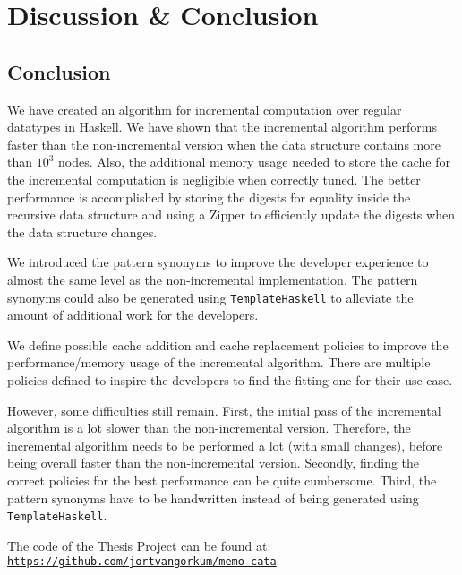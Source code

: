 \chapter{Discussion \& Conclusion}





\section{Conclusion}

We have created an algorithm for incremental computation over regular datatypes in Haskell. We have shown that the incremental algorithm performs faster than the non-incremental version when the data structure contains more than $10^3$ nodes. Also, the additional memory usage needed to store the cache for the incremental computation is negligible when correctly tuned. The better performance is accomplished by storing the digests for equality inside the recursive data structure and using a Zipper to efficiently update the digests when the data structure changes.

We introduced the pattern synonyms to improve the developer experience to almost the same level as the non-incremental implementation. The pattern synonyms could also be generated using \texttt{TemplateHaskell} to alleviate the amount of additional work for the developers.

We define possible cache addition and cache replacement policies to improve the performance/memory usage of the incremental algorithm. There are multiple policies defined to inspire the developers to find the fitting one for their use-case.

However, some difficulties still remain. First, the initial pass of the incremental algorithm is a lot slower than the non-incremental version. Therefore, the incremental algorithm needs to be performed a lot (with small changes), before being overall faster than the non-incremental version. Secondly, finding the correct policies for the best performance can be quite cumbersome. Third, the pattern synonyms have to be handwritten instead of being generated using \texttt{TemplateHaskell}.

The code of the Thesis Project can be found at: \href{https://github.com/jortvangorkum/memo-cata}{\texttt{https://github.com/jortvangorkum/memo-cata}}